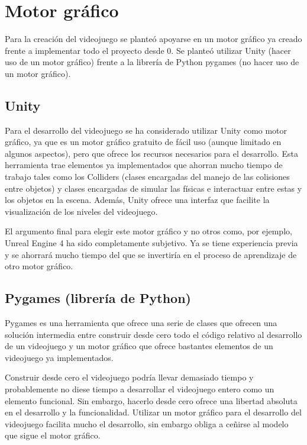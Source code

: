 
\section{Motor gráfico}
Para la creación del videojuego se planteó apoyarse en un motor gráfico ya creado frente a implementar todo el proyecto desde 0. Se planteó utilizar Unity (hacer uso de un motor gráfico) frente a la librería de Python pygames (no hacer uso de un motor gráfico).

\subsection{Unity}
Para el desarrollo del videojuego se ha considerado utilizar Unity como motor gráfico, ya que es un motor gráfico gratuito de fácil uso (aunque limitado en algunos aspectos), pero que ofrece los recursos necesarios para el desarrollo. Esta herramienta trae elementos ya implementados que ahorran mucho tiempo de trabajo tales como los Colliders (clases encargadas del manejo de las colisiones entre objetos) y clases encargadas de simular las físicas e interactuar entre estas y los objetos en la escena. Además, Unity ofrece una interfaz que facilite la visualización de los niveles del videojuego.

El argumento final para elegir este motor gráfico y no otros como, por ejemplo, Unreal Engine 4 ha sido completamente subjetivo. Ya se tiene experiencia previa y se ahorrará mucho tiempo del que se invertiría en el proceso de aprendizaje de otro motor gráfico.

\subsection{Pygames (librería de Python)}
Pygames es una herramienta que ofrece una serie de clases que ofrecen una solución intermedia entre construir desde cero todo el código relativo al desarrollo de un videojuego y un motor gráfico que ofrece bastantes elementos de un videojuego ya implementados. 

Construir desde cero el videojuego podría llevar demasiado tiempo y probablemente no diese tiempo a desarrollar el videojuego entero como un elemento funcional. Sin embargo, hacerlo desde cero ofrece una libertad absoluta en el desarrollo y la funcionalidad.
Utilizar un motor gráfico para el desarrollo del videojuego facilita mucho el desarrollo, sin embargo obliga a ceñirse al modelo que sigue el motor gráfico.

